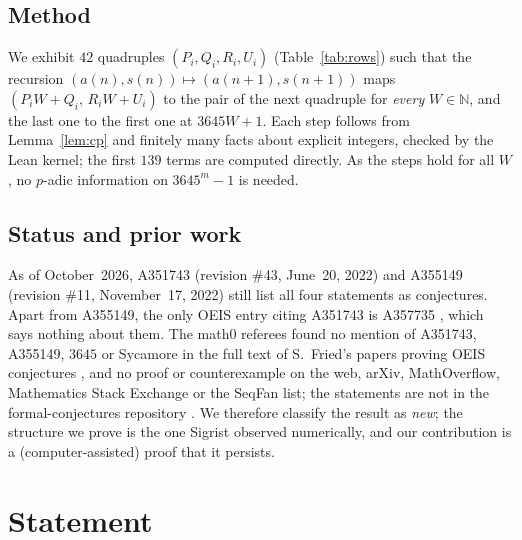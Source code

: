 \documentclass[11pt]{amsart}
\theoremstyle{plain}
\theoremstyle{definition}
\newcommand{\N}{\mathbb{N}}
\begin{document}
\subsection*{Method}
We exhibit $42$ quadruples $(P_i,Q_i,R_i,U_i)$ (Table~\ref{tab:rows}) such that the recursion $(a(n),s(n))\mapsto(a(n+1),s(n+1))$ maps $(P_iW+Q_i,\,R_iW+U_i)$ to the pair of the next quadruple for \emph{every} $W\in\N$, and the last one to the first one at $3645W+1$. Each step follows from Lemma~\ref{lem:cp} and finitely many facts about explicit integers, checked by the Lean kernel; the first $139$ terms are computed directly. As the steps hold for all $W$, no $p$-adic information on $3645^m-1$ is needed.

\subsection*{Status and prior work}
As of October~2026, A351743 (revision \#43, June~20, 2022) and A355149 (revision \#11, November~17, 2022) still list all four statements as conjectures. Apart from A355149, the only OEIS entry citing A351743 is A357735 \cite{A357735}, which says nothing about them.
The math0 referees found no mention of A351743, A355149, $3645$ or Sycamore in the full text of S.~Fried's papers proving OEIS conjectures \cite{Fr24,Fr25,Fr26,Fr26b}, and no proof or counterexample on the web, arXiv, MathOverflow, Mathematics Stack Exchange or the SeqFan list; the statements are not in the formal-conjectures repository \cite{FC}.
We therefore classify the result as \emph{new}; the structure we prove is the one Sigrist observed numerically, and our contribution is a (computer-assisted) proof that it persists.

\section{Statement}\label{sec:statement}
\end{document}
